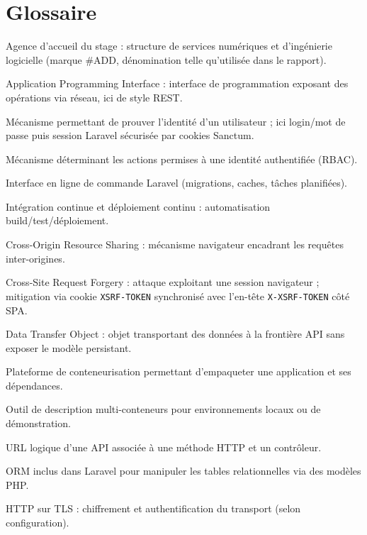 \cleardoublepage
{}
\chapter*{Glossaire}

\begin{description}[style=nextline,leftmargin=0.8cm]
  \item[\#ADD] Agence d'accueil du stage : structure de services numériques et d'ingénierie logicielle (marque \#ADD, dénomination telle qu'utilisée dans le rapport).
  \item[API] Application Programming Interface : interface de programmation exposant des opérations via réseau, ici de style REST.
  \item[Authentification] Mécanisme permettant de prouver l'identité d'un utilisateur ; ici login/mot de passe puis session Laravel sécurisée par cookies Sanctum.
  \item[Autorisation] Mécanisme déterminant les actions permises à une identité authentifiée (RBAC).
  \item[Artisan] Interface en ligne de commande Laravel (migrations, caches, tâches planifiées).
  \item[CI/CD] Intégration continue et déploiement continu : automatisation build/test/déploiement.
  \item[CORS] Cross-Origin Resource Sharing : mécanisme navigateur encadrant les requêtes inter-origines.
  \item[CSRF] Cross-Site Request Forgery : attaque exploitant une session navigateur ; mitigation via cookie \texttt{XSRF-TOKEN} synchronisé avec l'en-tête \texttt{X-XSRF-TOKEN} côté SPA.
  \item[DTO] Data Transfer Object : objet transportant des données à la frontière API sans exposer le modèle persistant.
  \item[Docker] Plateforme de conteneurisation permettant d'empaqueter une application et ses dépendances.
  \item[Docker Compose] Outil de description multi-conteneurs pour environnements locaux ou de démonstration.
  \item[Endpoint] URL logique d'une API associée à une méthode HTTP et un contrôleur.
  \item[Eloquent] ORM inclus dans Laravel pour manipuler les tables relationnelles via des modèles PHP.
  \item[HTTPS] HTTP sur TLS : chiffrement et authentification du transport (selon configuration).

\end{description}
